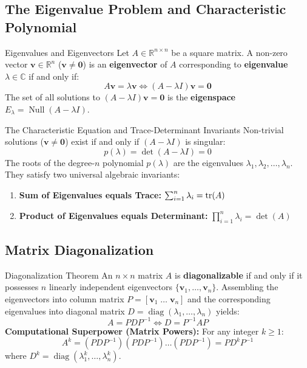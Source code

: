 \subsection{The Eigenvalue Problem and Characteristic Polynomial}

\begin{definitionbox}{Eigenvalues and Eigenvectors}
 
Let $A \in \mathbb{R}^{n \times n}$ be a square matrix. A non-zero vector $\mathbf{v} \in \mathbb{R}^n$ ($\mathbf{v} \neq \mathbf{0}$) is an \textbf{eigenvector} of $A$ corresponding to \textbf{eigenvalue} $\lambda \in \mathbb{C}$ if and only if:
\begin{equation}
A \mathbf{v} = \lambda \mathbf{v} \iff (A - \lambda I) \mathbf{v} = \mathbf{0}
\end{equation}
The set of all solutions to $(A - \lambda I)\mathbf{v} = \mathbf{0}$ is the \textbf{eigenspace} $E_\lambda = \operatorname{Null}(A - \lambda I)$.
\end{definitionbox}

\begin{theorembox}{The Characteristic Equation and Trace-Determinant Invariants}
Non-trivial solutions ($\mathbf{v} \neq \mathbf{0}$) exist if and only if $(A - \lambda I)$ is singular:
\begin{equation}
p(\lambda) = \det(A - \lambda I) = 0
\end{equation}
The roots of the degree-$n$ polynomial $p(\lambda)$ are the eigenvalues $\lambda_1, \lambda_2, \dots, \lambda_n$. They satisfy two universal algebraic invariants:
\begin{enumerate}
    \item \textbf{Sum of Eigenvalues equals Trace:} $\sum_{i=1}^n \lambda_i = \operatorname{tr}(A)$
    \item \textbf{Product of Eigenvalues equals Determinant:} $\prod_{i=1}^n \lambda_i = \det(A)$
\end{enumerate}
\end{theorembox}

\subsection{Matrix Diagonalization}

\begin{definitionbox}{Diagonalization Theorem}
An $n \times n$ matrix $A$ is \textbf{diagonalizable} if and only if it possesses $n$ linearly independent eigenvectors $\{\mathbf{v}_1, \dots, \mathbf{v}_n\}$.
Assembling the eigenvectors into column matrix $P = [\mathbf{v}_1 \; \dots \; \mathbf{v}_n]$ and the corresponding eigenvalues into diagonal matrix $D = \operatorname{diag}(\lambda_1, \dots, \lambda_n)$ yields:
\begin{equation}
A = P D P^{-1} \iff D = P^{-1} A P
\end{equation}
\textbf{Computational Superpower (Matrix Powers):} For any integer $k \ge 1$:
\begin{equation}
A^k = (P D P^{-1})(P D P^{-1}) \dots (P D P^{-1}) = P D^k P^{-1}
\end{equation}
where $D^k = \operatorname{diag}(\lambda_1^k, \dots, \lambda_n^k)$.
\end{definitionbox}

